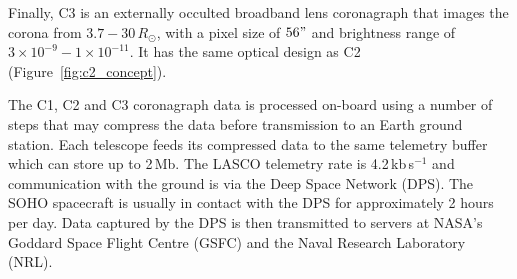Finally, C3 is an externally occulted broadband lens coronagraph that images the corona from $3.7-30\,R_{\odot}$, with a pixel size of $56"$ and brightness range of $3\times10^{-9} - 1\times10^{-11}$. It has the same optical design as C2 (Figure~\ref{fig:c2_concept}).

The C1, C2 and C3 coronagraph data is processed on-board using a number of steps that may compress the data before transmission to an Earth ground station. Each telescope feeds its compressed data to the same telemetry buffer which can store up to 2\,Mb. The  LASCO telemetry rate is 4.2\,kb\,s$^{-1}$ and communication with the ground is via the Deep Space Network (DPS). The SOHO spacecraft is usually in contact with the DPS for approximately 2 hours per day. Data captured by the DPS is then transmitted to servers at NASA's Goddard Space Flight Centre (GSFC) and the Naval Research Laboratory (NRL).


